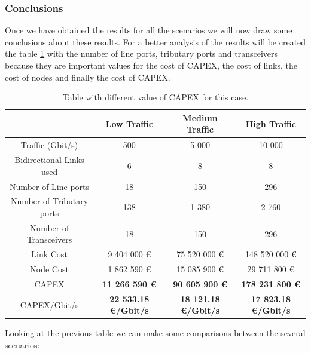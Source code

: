 \vspace{13pt}
\subsubsection{Conclusions}

Once we have obtained the results for all the scenarios we will now draw some conclusions about these results. For a better analysis of the results will be created the table \ref{table_comparative_opaque_surv} with the number of line ports, tributary ports and transceivers because they are important values for the cost of CAPEX, the cost of links, the cost of nodes and finally the cost of CAPEX.\\

\begin{table}[h!]
\centering
\begin{tabular}{| c | c | c | c |}
 \hline
  & Low Traffic & Medium Traffic  & High Traffic \\
 \hline\hline
 Traffic (Gbit/s) & 500 & 5 000 & 10 000 \\ \hline
 Bidirectional Links used & 6 & 8 & 8 \\ \hline
 Number of Line ports & 18 & 150 & 296 \\ \hline
 Number of Tributary ports & 138 & 1 380 & 2 760 \\ \hline
 Number of Transceivers & 18 & 150 & 296 \\ \hline
 Link Cost & 9 404 000 \euro & 75 520 000 \euro & 148 520 000 \euro \\ \hline
 Node Cost & 1 862 590 \euro & 15 085 900 \euro & 29 711 800 \euro \\ \hline
 CAPEX & \textbf{11 266 590 \euro} & \textbf{90 605 900 \euro} & \textbf{178 231 800 \euro} \\ \hline
 CAPEX/Gbit/s & \textbf{22 533.18 \euro/Gbit/s} & \textbf{18 121.18 \euro/Gbit/s} & \textbf{17 823.18 \euro/Gbit/s}\\
 \hline
\end{tabular}
\caption{Table with different value of CAPEX for this case.}
\label{table_comparative_opaque_surv}
\end{table}

\newpage
Looking at the previous table we can make some comparisons between the several scenarios:

